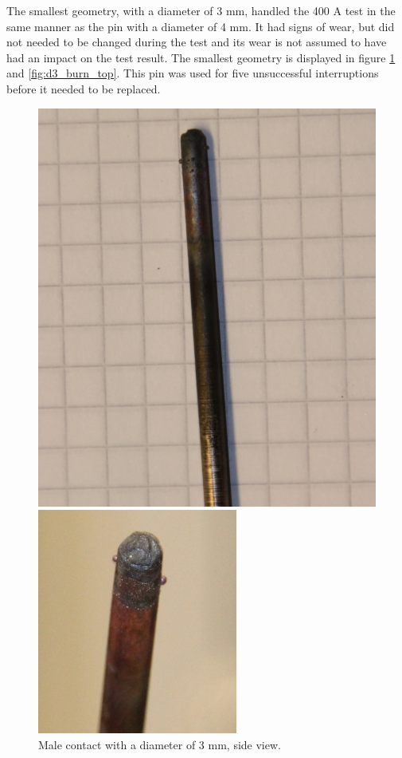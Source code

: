 \documentclass[10pt,a4paper]{article}
\begin{document}
The smallest geometry, with a diameter of 3 mm, handled the 400 A test in the same manner as the pin with a diameter of 4 mm. It had signs of wear, but did not needed to be changed during the test and its wear is not assumed to have had an impact on the test result. The smallest geometry is displayed in figure \ref{fig:d3_burn_side} and \ref{fig:d3_burn_top}. This pin was used for five unsuccessful interruptions before it needed to be replaced.


\begin{figure}[H]
\centering
\begin{minipage}{.5\textwidth}
  \centering
  \includegraphics[scale=0.2]{Bilder/Discussion/d3_630_burn.png}
  \caption{Male contact with a diameter of 3 mm, \newline side view.}
  \label{fig:d3_burn_side}
\end{minipage}%
\begin{minipage}{.5\textwidth}
  \centering
  \includegraphics[scale=0.61]{Bilder/Discussion/d3_630_top_burn.png}

\end{minipage}
\end{figure}
\end{document}
